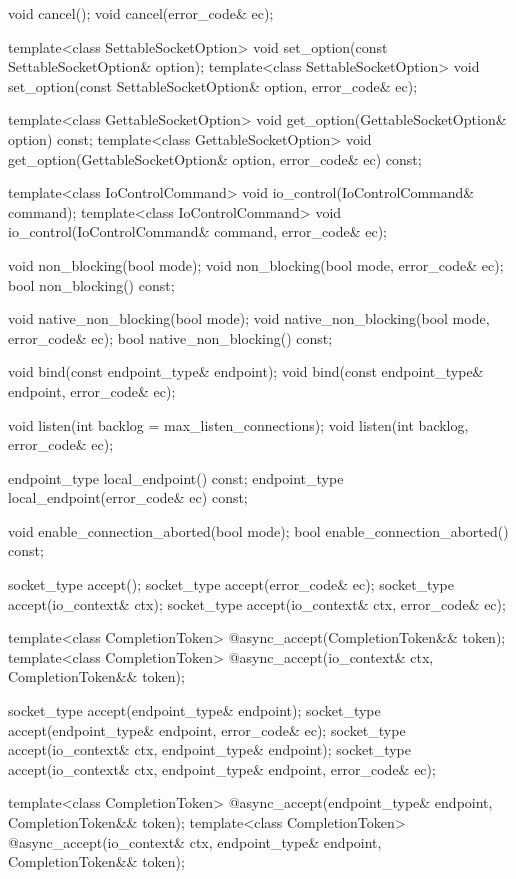 \begin{codeblock}
{{{{{    void cancel();
    void cancel(error_code& ec);

    template<class SettableSocketOption>
      void set_option(const SettableSocketOption& option);
    template<class SettableSocketOption>
      void set_option(const SettableSocketOption& option, error_code& ec);

    template<class GettableSocketOption>
      void get_option(GettableSocketOption& option) const;
    template<class GettableSocketOption>
      void get_option(GettableSocketOption& option, error_code& ec) const;

    template<class IoControlCommand>
      void io_control(IoControlCommand& command);
    template<class IoControlCommand>
      void io_control(IoControlCommand& command, error_code& ec);

    void non_blocking(bool mode);
    void non_blocking(bool mode, error_code& ec);
    bool non_blocking() const;

    void native_non_blocking(bool mode);
    void native_non_blocking(bool mode, error_code& ec);
    bool native_non_blocking() const;

    void bind(const endpoint_type& endpoint);
    void bind(const endpoint_type& endpoint, error_code& ec);

    void listen(int backlog = max_listen_connections);
    void listen(int backlog, error_code& ec);

    endpoint_type local_endpoint() const;
    endpoint_type local_endpoint(error_code& ec) const;

    void enable_connection_aborted(bool mode);
    bool enable_connection_aborted() const;

    socket_type accept();
    socket_type accept(error_code& ec);
    socket_type accept(io_context& ctx);
    socket_type accept(io_context& ctx, error_code& ec);

    template<class CompletionToken>
      @\DEDUCED@ async_accept(CompletionToken&& token);
    template<class CompletionToken>
      @\DEDUCED@ async_accept(io_context& ctx, CompletionToken&& token);

    socket_type accept(endpoint_type& endpoint);
    socket_type accept(endpoint_type& endpoint, error_code& ec);
    socket_type accept(io_context& ctx, endpoint_type& endpoint);
    socket_type accept(io_context& ctx, endpoint_type& endpoint,
                       error_code& ec);

    template<class CompletionToken>
      @\DEDUCED@ async_accept(endpoint_type& endpoint,
                           CompletionToken&& token);
    template<class CompletionToken>
      @\DEDUCED@ async_accept(io_context& ctx, endpoint_type& endpoint,
                           CompletionToken&& token);

}}}}}
\end{codeblock}

